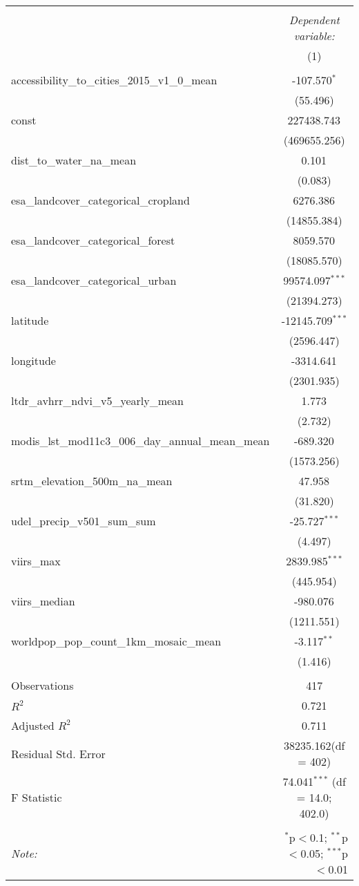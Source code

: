 \begin{table}[!htbp] \centering
\begin{tabular}{@{\extracolsep{5pt}}lc}
\\[-1.8ex]\hline
\hline \\[-1.8ex]
& \multicolumn{1}{c}{\textit{Dependent variable:}} \
\cr \cline{1-2}
\\[-1.8ex] & (1) \\
\hline \\[-1.8ex]
 accessibility_to_cities_2015_v1_0_mean & -107.570$^{*}$ \\
  & (55.496) \\
 const & 227438.743$^{}$ \\
  & (469655.256) \\
 dist_to_water_na_mean & 0.101$^{}$ \\
  & (0.083) \\
 esa_landcover_categorical_cropland & 6276.386$^{}$ \\
  & (14855.384) \\
 esa_landcover_categorical_forest & 8059.570$^{}$ \\
  & (18085.570) \\
 esa_landcover_categorical_urban & 99574.097$^{***}$ \\
  & (21394.273) \\
 latitude & -12145.709$^{***}$ \\
  & (2596.447) \\
 longitude & -3314.641$^{}$ \\
  & (2301.935) \\
 ltdr_avhrr_ndvi_v5_yearly_mean & 1.773$^{}$ \\
  & (2.732) \\
 modis_lst_mod11c3_006_day_annual_mean_mean & -689.320$^{}$ \\
  & (1573.256) \\
 srtm_elevation_500m_na_mean & 47.958$^{}$ \\
  & (31.820) \\
 udel_precip_v501_sum_sum & -25.727$^{***}$ \\
  & (4.497) \\
 viirs_max & 2839.985$^{***}$ \\
  & (445.954) \\
 viirs_median & -980.076$^{}$ \\
  & (1211.551) \\
 worldpop_pop_count_1km_mosaic_mean & -3.117$^{**}$ \\
  & (1.416) \\
\hline \\[-1.8ex]
 Observations & 417 \\
 $R^2$ & 0.721 \\
 Adjusted $R^2$ & 0.711 \\
 Residual Std. Error & 38235.162(df = 402)  \\
 F Statistic & 74.041$^{***}$ (df = 14.0; 402.0) \\
\hline
\hline \\[-1.8ex]
\textit{Note:} & \multicolumn{1}{r}{$^{*}$p$<$0.1; $^{**}$p$<$0.05; $^{***}$p$<$0.01} \\
\end{tabular}
\end{table}